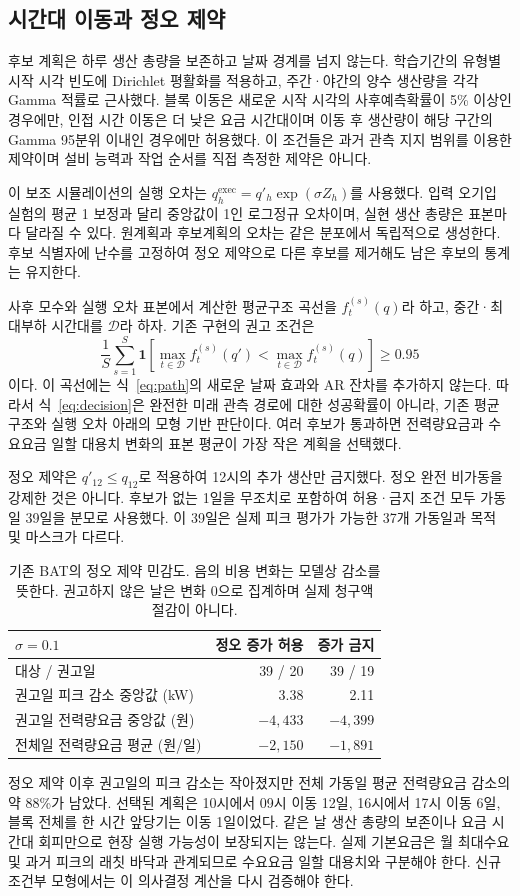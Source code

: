 \subsection{시간대 이동과 정오 제약}
후보 계획은 하루 생산 총량을 보존하고 날짜 경계를 넘지 않는다. 학습기간의 유형별 시작 시각 빈도에 Dirichlet 평활화를 적용하고, 주간·야간의 양수 생산량을 각각 Gamma 적률로 근사했다. 블록 이동은 새로운 시작 시각의 사후예측확률이 5\% 이상인 경우에만, 인접 시간 이동은 더 낮은 요금 시간대이며 이동 후 생산량이 해당 구간의 Gamma 95분위 이내인 경우에만 허용했다. 이 조건들은 과거 관측 지지 범위를 이용한 제약이며 설비 능력과 작업 순서를 직접 측정한 제약은 아니다.

이 보조 시뮬레이션의 실행 오차는 $q^{\mathrm{exec}}_h=q'_h\exp(\sigma Z_h)$를 사용했다. 입력 오기입 실험의 평균 1 보정과 달리 중앙값이 1인 로그정규 오차이며, 실현 생산 총량은 표본마다 달라질 수 있다. 원계획과 후보계획의 오차는 같은 분포에서 독립적으로 생성한다. 후보 식별자에 난수를 고정하여 정오 제약으로 다른 후보를 제거해도 남은 후보의 통계는 유지한다.

사후 모수와 실행 오차 표본에서 계산한 평균구조 곡선을 $f_t^{(s)}(q)$라 하고, 중간·최대부하 시간대를 $\mathcal D$라 하자. 기존 구현의 권고 조건은
\begin{equation}
\frac1S\sum_{s=1}^S\mathbf1\!\left[
 \max_{t\in\mathcal D}f_t^{(s)}(q')
 <\max_{t\in\mathcal D}f_t^{(s)}(q)\right]\ge0.95
\label{eq:decision}
\end{equation}
이다. 이 곡선에는 식~\eqref{eq:path}의 새로운 날짜 효과와 AR 잔차를 추가하지 않는다. 따라서 식~\eqref{eq:decision}은 완전한 미래 관측 경로에 대한 성공확률이 아니라, 기존 평균구조와 실행 오차 아래의 모형 기반 판단이다. 여러 후보가 통과하면 전력량요금과 수요요금 일할 대용치 변화의 표본 평균이 가장 작은 계획을 선택했다.

정오 제약은 $q'_{12}\le q_{12}$로 적용하여 12시의 추가 생산만 금지했다. 정오 완전 비가동을 강제한 것은 아니다. 후보가 없는 1일을 무조치로 포함하여 허용·금지 조건 모두 가동일 39일을 분모로 사용했다. 이 39일은 실제 피크 평가가 가능한 37개 가동일과 목적 및 마스크가 다르다.

\begin{table}[t]
\centering\footnotesize
\setlength{\tabcolsep}{3pt}
\begin{tabular}{@{}lrr@{}}
\toprule
$\sigma=0.1$ & 정오 증가 허용 & 증가 금지 \\
\midrule
대상 / 권고일 & 39 / 20 & 39 / 19 \\
권고일 피크 감소 중앙값 (kW) & 3.38 & 2.11 \\
권고일 전력량요금 중앙값 (원) & $-4{,}433$ & $-4{,}399$ \\
전체일 전력량요금 평균 (원/일) & $-2{,}150$ & $-1{,}891$ \\
\bottomrule
\end{tabular}
\caption{기존 BAT의 정오 제약 민감도. 음의 비용 변화는 모델상 감소를 뜻한다. 권고하지 않은 날은 변화 0으로 집계하며 실제 청구액 절감이 아니다.}
\label{tab:noon}
\end{table}

정오 제약 이후 권고일의 피크 감소는 작아졌지만 전체 가동일 평균 전력량요금 감소의 약 88\%가 남았다. 선택된 계획은 10시에서 09시 이동 12일, 16시에서 17시 이동 6일, 블록 전체를 한 시간 앞당기는 이동 1일이었다. 같은 날 생산 총량의 보존이나 요금 시간대 회피만으로 현장 실행 가능성이 보장되지는 않는다. 실제 기본요금은 월 최대수요 및 과거 피크의 래칫 바닥과 관계되므로 수요요금 일할 대용치와 구분해야 한다. 신규 조건부 모형에서는 이 의사결정 계산을 다시 검증해야 한다.
